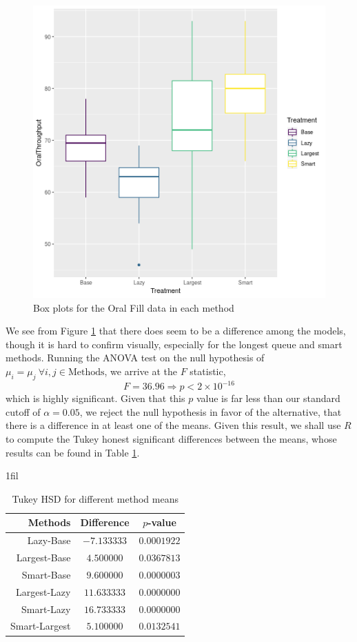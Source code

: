 \documentclass[10pt]{report}            %
\makeatletter
\newcommand*{\centerfloat}{%
  \parindent \z@
  \leftskip \z@ \@plus 1fil \@minus \textwidth
  \rightskip\leftskip
  \parfillskip \z@skip}
\makeatother
\begin{document}
\begin{figure}[H]
\centering
\includegraphics[scale=.5]{anovaBox.png}
\caption{Box plots for the Oral Fill data in each method}
\label{fig:anovaBox}
\end{figure}
We see from Figure \ref{fig:anovaBox} that there does seem to be a difference among the models, though it is hard to confirm visually, especially for the longest queue and smart methods. Running the ANOVA test on the null hypothesis of $\mu_i=\mu_j\ \forall i,j\in\text{Methods}$, we arrive at the $F$ statistic, 
\[F=36.96\Rightarrow p<2\times10^{-16}\]
which is highly significant. Given that this $p$ value is far less than our standard cutoff of $\alpha = 0.05$, we reject the null hypothesis in favor of the alternative, that there is a difference in at least one of the means. Given this result, we shall use $R$ to compute the Tukey honest significant differences between the means, whose results can be found in Table \ref{table:tukey}.
\begin{table}[H]
\centerfloat
\begin{tabular}{|r||c|c|}
\hline
Methods & Difference & $p$-value\\\hline\hline
Lazy-Base   &  $-7.133333$ & $0.0001922$\\\hline
\cellcolor{yellow!25}Largest-Base  & \cellcolor{yellow!25}$4.500000$ & \cellcolor{yellow!25}$0.0367813$\\\hline
Smart-Base  &   $9.600000$ & $0.0000003$\\\hline
Largest-Lazy & $11.633333$ & $0.0000000$\\\hline
Smart-Lazy  &  $16.733333$ & $0.0000000$\\\hline
\cellcolor{yellow!25}Smart-Largest & \cellcolor{yellow!25}$5.100000$ & \cellcolor{yellow!25}$0.0132541$\\\hline
\end{tabular}
\caption{Tukey HSD for different method means}
\label{table:tukey}
\end{table}
\end{document}

